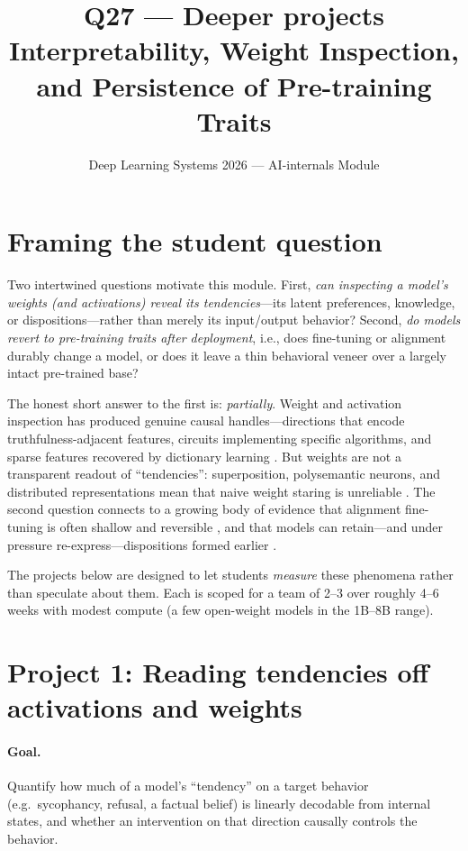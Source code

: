 \documentclass[11pt]{article}
\title{Q27 --- Deeper projects\\\large Interpretability, Weight Inspection, and Persistence of Pre-training Traits}
\author{Deep Learning Systems 2026 --- AI-internals Module}
\date{}
\begin{document}
\maketitle

\section*{Framing the student question}

Two intertwined questions motivate this module. First, \emph{can inspecting a
model's weights (and activations) reveal its tendencies}---its latent
preferences, knowledge, or dispositions---rather than merely its input/output
behavior? Second, \emph{do models revert to pre-training traits after
deployment}, i.e., does fine-tuning or alignment durably change a model, or does
it leave a thin behavioral veneer over a largely intact pre-trained base?

The honest short answer to the first is: \emph{partially}. Weight and activation
inspection has produced genuine causal handles---directions that encode
truthfulness-adjacent features, circuits implementing specific algorithms, and
sparse features recovered by dictionary learning
\citep{elhage2021mathematical,olsson2022context,bricken2023monosemanticity,templeton2024scaling,marks2023geometry}.
But weights are not a transparent readout of ``tendencies'': superposition,
polysemantic neurons, and distributed representations mean that naive weight
staring is unreliable \citep{elhage2022superposition}. The second question
connects to a growing body of evidence that alignment fine-tuning is often
shallow and reversible \citep{jain2024mechanistically,qi2024safety,lee2024mechanistic},
and that models can retain---and under pressure re-express---dispositions formed
earlier \citep{hubinger2024sleeper,greenblatt2024alignment}.

The projects below are designed to let students \emph{measure} these phenomena
rather than speculate about them. Each is scoped for a team of 2--3 over roughly
4--6 weeks with modest compute (a few open-weight models in the 1B--8B range).

\section*{Project 1: Reading tendencies off activations and weights}

\paragraph{Goal.} Quantify how much of a model's ``tendency'' on a target
behavior (e.g.\ sycophancy, refusal, a factual belief) is linearly decodable
from internal states, and whether an intervention on that direction causally
controls the behavior.
\end{document}
